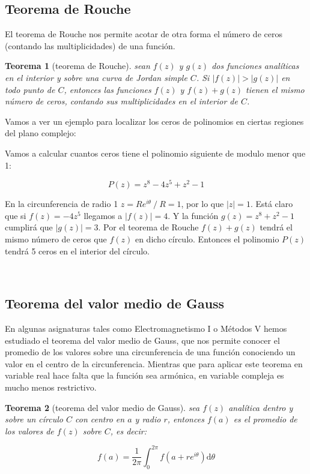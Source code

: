 \documentclass[12pt,a4paper]{book}
\newcommand{\D}{\mathrm{d}}
\newtheorem{theorem}{Teorema}[section]
\begin{document}
\subsection{Teorema de Rouche}

El teorema de Rouche nos permite acotar de otra forma el número de ceros (contando las multiplicidades) de una función. 

\begin{theorem}[teorema de Rouche]
sean $f(z)$ y $g(z)$ dos funciones analíticas en el interior y sobre una curva de Jordan simple $C$. Si $|f(z)|>|g(z)|$ en todo punto de $C$, entonces las funciones $f(z)$ y $f(z)+g(z)$ tienen el mismo número de ceros, contando sus multiplicidades en el interior de $C$.
\end{theorem}

Vamos a ver un ejemplo para localizar los ceros de polinomios en ciertas regiones del plano complejo:\\


\hrulefill

Vamos a calcular cuantos ceros tiene el polinomio siguiente de modulo menor que 1:

$$ P(z) = z^8 - 4z^5 + z^2 - 1 $$

En la circunferencia de radio 1 $z=Re^{i\theta} \ / \ R=1$, por lo que $|z|=1$. Está claro que si $f(z) = - 4 z^5$ llegamos a $|f(z)| = 4$. Y la función $g(z) = z^8 + z^2 -1$ cumplirá que $|g(z)|=3$. Por el teorema de Rouche $f(z)+g(z)$ tendrá el mismo número de ceros que $f(z)$ en dicho círculo. Entonces el polinomio $P(z)$ tendrá 5 ceros en el interior del círculo. 


\hrulefill \\



\subsection{Teorema del valor medio de Gauss}

En algunas asignaturas tales como Electromagnetismo I o Métodos V hemos estudiado el teorema del valor medio de Gauss, que nos permite conocer el promedio de los valores sobre una circunferencia de una función conociendo un valor en el centro de la circunferencia. Mientras que para aplicar este teorema en variable real hace falta que la función sea armónica, en variable compleja es mucho menos restrictivo.

\begin{theorem}[teorema del valor medio de Gauss]
sea $f(z)$ analítica dentro y sobre un círculo $C$ con centro en $a$ y radio $r$, entonces $f(a)$ es el promedio de los valores de $f(z)$ sobre $C$, es decir:

$$ f(a) = \frac{1}{2 \pi} \int_0^{2\pi} f(a+re^{i \theta}) \D  \theta $$
\end{theorem}
\end{document}
